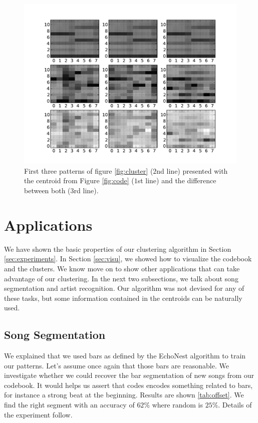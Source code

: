 \documentclass{article}
\begin{document}
\begin{figure}[htb]
\begin{center}
\includegraphics[width=.8\columnwidth]{close_patterns_diff}
\end{center}
\caption{\small{First three patterns of figure \ref{fig:cluster}
($2$nd line) presented with the centroid from Figure \ref{fig:code}
($1$st line) and the difference between both ($3$rd line).
}}
\label{fig:cluster_diff}
\end{figure}

\section{Applications}\label{sec:exps2}
We have shown the basic properties of our clustering algorithm in
Section \ref{sec:experiments}. In Section \ref{sec:visu}, we showed
how to visualize the codebook and the clusters. We know move on to
show other applications that can take advantage of our clustering.
In the next two subsections, we talk about song segmentation and
artist recognition. Our algorithm was not devised for any of these tasks,
but some information contained in the centroids can be naturally used.

\subsection{Song Segmentation}
We explained that we used bars as defined by the EchoNest algorithm to
train our patterns. Let's assume once again that those bars are
reasonable. We investigate whether we could recover the bar segmentation
of new songs from our codebook. It would helps us assert that codes
encodes something related to bars, for instance a strong beat at the
beginning. Results are shown \ref{tab:offset}. We find the right segment
with an accuracy of $62\%$ where random is $25\%$. Details of the
experiment follow.
\end{document}

